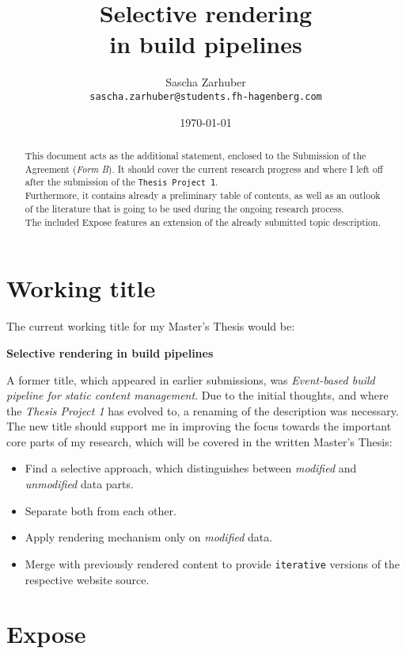 \documentclass[a4paper,english,11pt]{article}
\author{
Sascha Zarhuber\\ 
\texttt{sascha.zarhuber@students.fh-hagenberg.com}
}
\title{Selective rendering\\
in build pipelines}
\date{\today}
\begin{document}
\maketitle
\tableofcontents

\begin{abstract}
This document acts as the additional statement, enclosed to the Submission of the Agreement (\emph{Form B}). It should cover the current research progress and where I left off after the submission of the \texttt{Thesis Project 1}.\\
Furthermore, it contains already a preliminary table of contents, as well as an outlook of the literature that is going to be used during the ongoing research process.\\
The included Expose features an extension of the already submitted topic description.
\end{abstract}


\section{Working title}

The current working title for my Master's Thesis would be:

\begin{center}
\textbf{Selective rendering in build pipelines}
\end{center}

A former title, which appeared in earlier submissions, was \emph{Event-based build pipeline for static content management}. Due to the initial thoughts, and where the \emph{Thesis Project 1} has evolved to, a renaming of the description was necessary.\\
The new title should support me in improving the focus towards the important core parts of my research, which will be covered in the written Master's Thesis:
\begin{itemize}
	\item Find a selective approach, which distinguishes between \emph{modified} and \emph{unmodified} data parts.
	\item Separate both from each other.
	\item Apply rendering mechanism only on \emph{modified} data.
	\item Merge with previously rendered content to provide \texttt{iterative} versions of the respective website source.
\end{itemize}

\section{Expose}




  
\printbibliography  %

\end{document}
